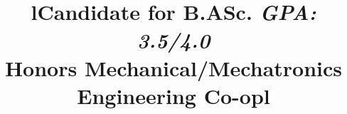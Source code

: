 \documentclass[mm]{res}
\begin{document}
\begin{resume}

\toprule
\section{\headingeducation}
\begin{format}
\\
\title{l}\\
\end{format}

\title{Candidate for B.ASc. \textsl{GPA: 3.5/4.0}\\
Honors Mechanical/Mechatronics Engineering Co-op}
\begin{position}
\end{position}


\toprule
\section{\headingexperience}
\begin{format}
\\
\title{l}\\
\body\\
\end{format}


\end{resume}
\end{document}

